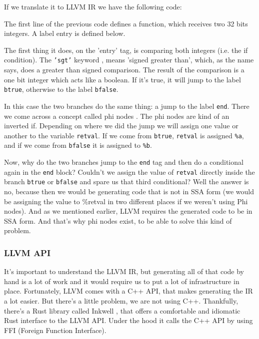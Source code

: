 ﻿\documentclass[10pt,a4paper,twocolumn,twoside]{article}
\begin{document}
If we translate it to LLVM IR we have the following code:


The first line of the previous code defines a function, which receives two
32 bits integers. A label entry is defined below.

The first thing it does, on the 'entry' tag, is comparing both integers (i.e.
the if condition). The \texttt{'sgt'} keyword \cite{sgt}, means 'signed greater
than', which, as the name says, does a greater than signed comparison. The
result of the comparison is a one bit integer which acts like a boolean. If it's
true, it will jump to the label \texttt{btrue}, otherwise to the label
\texttt{bfalse}.

In this case the two branches do the same thing: a jump to the label
\texttt{end}. There we come across a concept called phi nodes
\cite{phitutorial}\cite{phiinst}. The phi nodes are kind of an inverted if.
Depending on where we did the jump we will assign one value or another to the
variable \texttt{retval}. If we come from \texttt{btrue}, \texttt{retval} is
assigned \texttt{\%a}, and if we come from \texttt{bfalse} it is assigned to
\texttt{\%b}.

Now, why do the two branches jump to the \texttt{end} tag and then do a
conditional again in the \texttt{end} block? Couldn't we assign the value of
\texttt{retval} directly inside the branch \texttt{btrue} or \texttt{bfalse} and
spare us that third conditional? Well the answer is no, because then we would be
generating code that is not in SSA form (we would be assigning the value to
\%retval in two different places if we weren't using Phi nodes). And as we
mentioned earlier, LLVM requires the generated code to be in SSA form. And
that's why phi nodes exist, to be able to solve this kind of problem.

\subsubsection{LLVM API}

It's important to understand the LLVM IR, but generating all of that code by
hand is a lot of work and it would require us to put a lot of infrastructure in
place. Fortunately, LLVM comes with a C++ API, that makes generating the IR a
lot easier. But there's a little problem, we are not using C++. Thankfully,
there's a Rust library called Inkwell \cite{inkwell}, that offers a comfortable
and idiomatic Rust interface to the LLVM API. Under the hood it calls the C++
API by using FFI (Foreign Function Interface).
\end{document}
